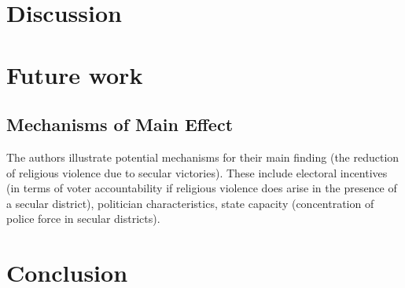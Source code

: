 \documentclass{scrartcl}
\begin{document}
\section{Discussion}


\section{Future work}
\subsection{Mechanisms of Main Effect}

The authors illustrate potential mechanisms for their main finding (the reduction of religious violence due to secular victories). These include electoral incentives (in terms of voter accountability if religious violence does arise in the presence of a secular district), politician characteristics, state capacity (concentration of police force in secular districts).

\section{Conclusion}
\end{document}
